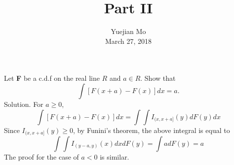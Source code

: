 \documentclass{article}
\newcommand{\tmaffiliation}[1]{\\ #1}
\newcommand{\tmtextbf}[1]{{\bfseries{#1}}}
\begin{document}
\title{Part II}

\author{
  Yuejian Mo
  \tmaffiliation{March 27, 2018}
}

\maketitle

Let \tmtextbf{F} be a c.d.f on the real line $R$ and $a \in R$. Show that
\[ \int [F (x + a) - F (x)] d x = a. \]
Solution. For $a \geqslant 0$,
\[ \int [F (x + a) - F (x)] d x = \int \int I_{(x, x + a]} (y) d F (y) d x \]
Since $I_{(x, x + a]} (y) \geqslant 0$, by Funini's theorem, the above
integral is equal to
\[ \int \int I_{(y - a, y)} (x) d x d F (y) = \int a d F (y) = a \]
The proof for the case of $a < 0$ is similar.

\
\end{document}
